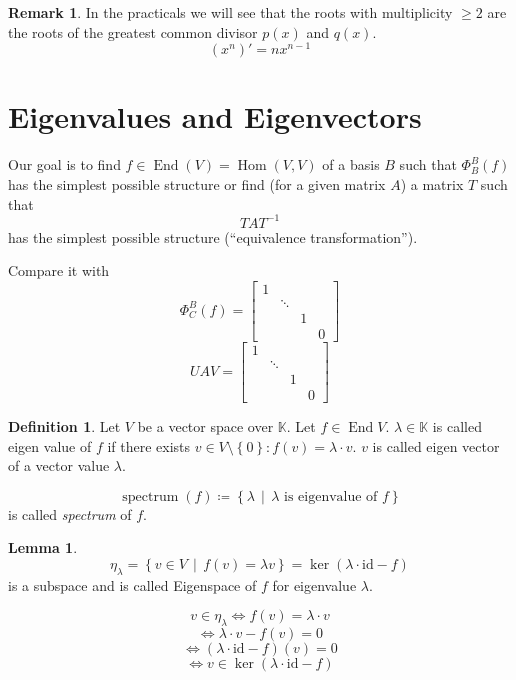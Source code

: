 \documentclass[a4paper,landscape,twocolumn]{article}
\newcommand\set[1]{\left\{#1\right\}}
\newcommand\setdef[2]{\left\{#1\,\middle|\,#2\right\}}
\theoremstyle{definition}
\newtheorem{defi}{Definition}
\newtheorem{rem}{Remark}
\newtheorem{lemma}{Lemma}
\DeclareMathOperator\Hom{Hom} %
\DeclareMathOperator\End{End} %
\DeclareMathOperator\kernel{ker} %
\DeclareMathOperator\spec{spectrum}
\begin{document}
\begin{rem}
  In the practicals we will see that the roots with multiplicity $\geq 2$
  are the roots of the greatest common divisor $p(x)$ and $q(x)$.
  \[ (x^n)' = nx^{n-1} \]
\end{rem}

\section{Eigenvalues and Eigenvectors}
%
Our goal is to find $f \in \End(V) = \Hom(V, V)$ of a basis $B$ such that
$\Phi_B^B(f)$ has the simplest possible structure or find (for a given matrix $A$)
a matrix $T$ such that
\[ T A T^{-1} \]
has the simplest possible structure (\enquote{equivalence transformation}).

Compare it with
\[
  \Phi_C^B(f) =
    \begin{bmatrix}
      1 &        &   &   \\
        & \ddots &   &   \\
        &        & 1 &   \\
        &        &   & 0
    \end{bmatrix}
\] \[
  UAV = \begin{bmatrix}
    1 &        &   &   \\
      & \ddots &   &   \\
      &        & 1 &   \\
      &        &   & 0
  \end{bmatrix}
\]

\begin{defi}
  \label{defi-10.1}
  Let $V$ be a vector space over $\mathbb K$. Let $f \in \End{V}$.
  $\lambda \in \mathbb K$ is called eigen value of $f$
  if there exists $v \in V \setminus \set{0}: f(v) = \lambda \cdot v$.
  $v$ is called eigen vector of a vector value $\lambda$.

  \[ \spec(f) \coloneqq \setdef{\lambda}{\lambda \text{ is eigenvalue of } f} \]
  is called \emph{spectrum} of $f$.
\end{defi}

\begin{lemma}
  \label{lemma-10.2}
  \[ \eta_\lambda = \setdef{v \in V}{f(v) = \lambda v} = \kernel(\lambda \cdot \text{id} - f) \]
  is a subspace and is called Eigenspace of $f$ for eigenvalue $\lambda$.

  \[ v \in \eta_{\lambda} \Leftrightarrow f(v) = \lambda \cdot v \]
  \[ \Leftrightarrow \lambda \cdot v - f(v) = 0 \]
  \[ \Leftrightarrow (\lambda \cdot \text{id} - f)(v) = 0 \]
  \[ \Leftrightarrow v \in \kernel(\lambda \cdot \text{id} - f) \]
\end{lemma}
\end{document}
